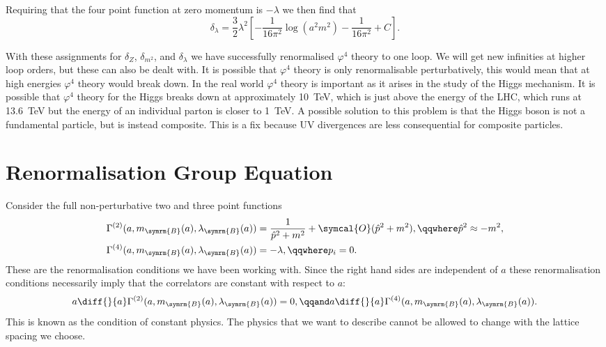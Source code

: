 \documentclass[fleqn]{NotesClass}
\newcommand{\bare}{\symrm{B}}
\newcommand{\order}{\symcal{O}}
\begin{document}
    Requiring that the four point function at zero momentum is \(-\lambda\) we then find that
    \begin{equation}
        \delta_\lambda = \frac{3}{2}\lambda^2\left[ -\frac{1}{16\pi^2}\log(a^2 m^2) - \frac{1}{16\pi^2} + C \right].
    \end{equation}
    
    With these assignments for \(\delta_Z\), \(\delta_{m^2}\), and \(\delta_\lambda\) we have successfully renormalised \(\varphi^4\) theory to one loop.
    We will get new infinities at higher loop orders, but these can also be dealt with.
    It is possible that \(\varphi^4\) theory is only renormalisable perturbatively, this would mean that at high energies \(\varphi^4\) theory would break down.
    In the real world \(\varphi^4\) theory is important as it arises in the study of the Higgs mechanism.
    It is possible that \(\varphi^4\) theory for the Higgs breaks down at approximately \qty{10}{\tera\electronvolt}, which is just above the energy of the LHC, which runs at \qty{13.6}{\tera\electronvolt} but the energy of an individual parton is closer to \qty{1}{\tera\electronvolt}.
    A possible solution to this problem is that the Higgs boson is not a fundamental particle, but is instead composite.
    This is a fix because UV divergences are less consequential for composite particles.
    
    \section{Renormalisation Group Equation}
    Consider the full non-perturbative two and three point functions
    \begin{align}
        \Gamma^{(2)}(a, m_{\bare}(a), \lambda_{\bare}(a)) &= \frac{1}{\hat{p}^2 + m^2} + \order(\hat{p}^2 + m^2), \qqwhere \hat{p}^2 \approx -m^2,\\
        \Gamma^{(4)}(a, m_{\bare}(a), \lambda_{\bare}(a)) &= -\lambda, \qqwhere p_i = 0.
    \end{align}
    These are the renormalisation conditions we have been working with.
    Since the right hand sides are independent of \(a\) these renormalisation conditions necessarily imply that the correlators are constant with respect to \(a\):
    \begin{equation}
        a\diff{}{a}\Gamma^{(2)}(a, m_{\bare}(a), \lambda_{\bare}(a)) = 0, \qqand a\diff{}{a}\Gamma^{(4)}(a, m_{\bare}(a), \lambda_{\bare}(a)).
    \end{equation}
    This is known as the condition of constant physics.
    The physics that we want to describe cannot be allowed to change with the lattice spacing we choose.
    
\end{document}
